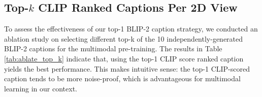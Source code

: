 \documentclass[10pt,twocolumn,letterpaper]{article}
\begin{document}
\vspace{-2mm}
\subsection{Top-\texorpdfstring{$k$}{k} CLIP Ranked Captions Per 2D View}
\label{sec:top_k_captions}
To assess the effectiveness of our top-1 BLIP-2 caption strategy, we conducted an ablation study on selecting different top-k of the 10 independently-generated BLIP-2 captions for the multimodal pre-training. The results in Table \ref{tab:ablate_top_k} indicate that, using the top-1 CLIP score ranked caption yields the best performance. This makes intuitive sense: the top-1 CLIP-scored caption tends to be more noise-proof, which is advantageous for multimodal learning in our context.
\end{document}
